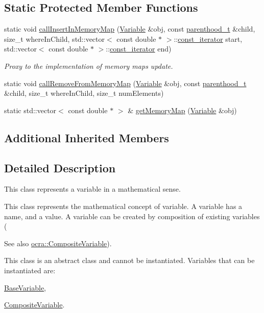 \subsection*{Static Protected Member Functions}
{\bf }\par
\begin{DoxyCompactItemize}
\item 
static void \hyperlink{classocra_1_1Variable_a9f276d7d5388a8a1e2b9d9b8ef5ffa11}{call\+Insert\+In\+Memory\+Map} (\hyperlink{classocra_1_1Variable}{Variable} \&obj, const \hyperlink{classocra_1_1Variable_a88444b2124cf5aab069f46734822f31f}{parenthood\+\_\+t} \&child, size\+\_\+t where\+In\+Child, std\+::vector$<$ const double $\ast$ $>$\+::\hyperlink{classocra_1_1Component_a6271631f04d2911e4369d1288074eebb}{const\+\_\+iterator} start, std\+::vector$<$ const double $\ast$ $>$\+::\hyperlink{classocra_1_1Component_a6271631f04d2911e4369d1288074eebb}{const\+\_\+iterator} end)
\begin{DoxyCompactList}\small\item\em Proxy to the implementation of memory maps update. \end{DoxyCompactList}\item 
static void \hyperlink{classocra_1_1Variable_a2433c62cad31e263aba58e16b6426971}{call\+Remove\+From\+Memory\+Map} (\hyperlink{classocra_1_1Variable}{Variable} \&obj, const \hyperlink{classocra_1_1Variable_a88444b2124cf5aab069f46734822f31f}{parenthood\+\_\+t} \&child, size\+\_\+t where\+In\+Child, size\+\_\+t num\+Elements)
\item 
static std\+::vector$<$ const double $\ast$ $>$ \& \hyperlink{classocra_1_1Variable_a7d1596e0377ebc5a74254027a425d334}{get\+Memory\+Map} (\hyperlink{classocra_1_1Variable}{Variable} \&obj)
\end{DoxyCompactItemize}

\subsection*{Additional Inherited Members}


\subsection{Detailed Description}
This class represents a variable in a mathematical sense. 

This class represents the mathematical concept of variable. A variable has a name, and a value. A variable can be created by composition of existing variables (\begin{DoxySeeAlso}{See also}
\hyperlink{classocra_1_1CompositeVariable}{ocra\+::\+Composite\+Variable}).
\end{DoxySeeAlso}
This class is an abstract class and cannot be instantiated. Variables that can be instantiated are\+:
\begin{DoxyItemize}
\item \hyperlink{classocra_1_1BaseVariable}{Base\+Variable},
\item \hyperlink{classocra_1_1CompositeVariable}{Composite\+Variable}.
\end{DoxyItemize}

